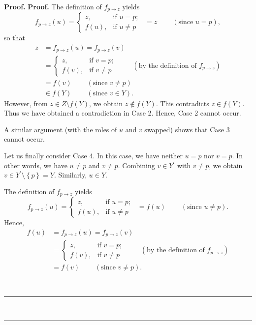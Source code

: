 \documentclass[numbers=enddot,12pt,final,onecolumn,notitlepage]{scrartcl}%
\numberwithin{exer}{section}
\theoremstyle{definition}
\newenvironment{proof}[1][Proof]{\noindent\textbf{#1.} }{\ \rule{0.5em}{0.5em}}
\newenvironment{verlong}{}{}
\begin{document}
\begin{verlong}
\begin{proof}
\begin{proof}
The definition of $f_{p\rightarrow z}$ yields%
\[
f_{p\rightarrow z}\left(  u\right)  =%
\begin{cases}
z, & \text{if }u=p;\\
f\left(  u\right)  , & \text{if }u\neq p
\end{cases}
\ \ =z\ \ \ \ \ \ \ \ \ \ \left(  \text{since }u=p\right)  ,
\]
so that
\begin{align*}
z  &  =f_{p\rightarrow z}\left(  u\right)  =f_{p\rightarrow z}\left(  v\right)
\\
&  =%
\begin{cases}
z, & \text{if }v=p;\\
f\left(  v\right)  , & \text{if }v\neq p
\end{cases}
\ \ \ \ \ \ \ \ \ \ \left(  \text{by the definition of }f_{p\rightarrow
z}\right) \\
&  =f\left(  v\right)  \ \ \ \ \ \ \ \ \ \ \left(  \text{since }v\neq p\right)
\\
&  \in f\left(  Y\right)  \ \ \ \ \ \ \ \ \ \ \left(  \text{since }v\in
Y\right)  .
\end{align*}
However, from $z\in Z\setminus f\left(  Y\right)  $, we obtain $z\notin
f\left(  Y\right)  $. This contradicts $z\in f\left(  Y\right)  $. Thus we
have obtained a contradiction in Case 2. Hence, Case 2 cannot occur.

A similar argument (with the roles of $u$ and $v$ swapped) shows that Case 3
cannot occur.

Let us finally consider Case 4. In this case, we have neither $u=p$ nor $v=p$.
In other words, we have $u\neq p$ and $v\neq p$. Combining $v\in Y^{\prime}$
with $v\neq p$, we obtain $v\in Y^{\prime}\setminus\left\{  p\right\}  =Y$.
Similarly, $u\in Y$.

The definition of $f_{p\rightarrow z}$ yields%
\[
f_{p\rightarrow z}\left(  u\right)  =%
\begin{cases}
z, & \text{if }u=p;\\
f\left(  u\right)  , & \text{if }u\neq p
\end{cases}
\ \ =f\left(  u\right)  \ \ \ \ \ \ \ \ \ \ \left(  \text{since }u\neq
p\right)  .
\]
Hence,%
\begin{align*}
f\left(  u\right)   &  =f_{p\rightarrow z}\left(  u\right)  =f_{p\rightarrow
z}\left(  v\right) \\
&  =%
\begin{cases}
z, & \text{if }v=p;\\
f\left(  v\right)  , & \text{if }v\neq p
\end{cases}
\ \ \ \ \ \ \ \ \ \ \left(  \text{by the definition of }f_{p\rightarrow
z}\right) \\
&  =f\left(  v\right)  \ \ \ \ \ \ \ \ \ \ \left(  \text{since }v\neq
p\right)  .
\end{align*}



\end{proof}
\end{proof}
\end{verlong}
\end{document}
